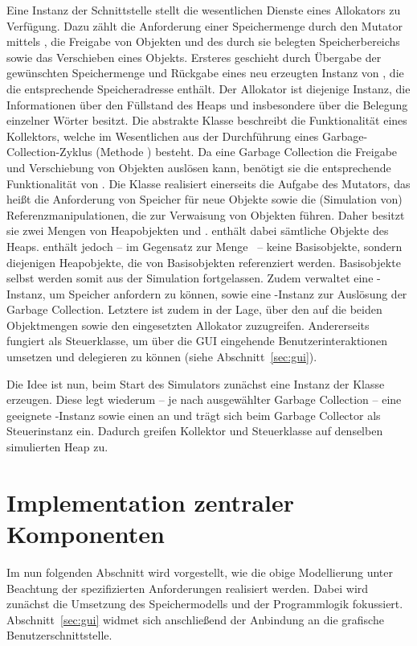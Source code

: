 Eine Instanz der Schnittstelle  stellt die wesentlichen Dienste eines Allokators zu Verfügung.
Dazu zählt die Anforderung einer Speichermenge durch den Mutator mittels , die Freigabe von Objekten und des durch sie belegten Speicherbereichs sowie das Verschieben eines Objekts.
Ersteres geschieht durch Übergabe der gewünschten Speichermenge und Rückgabe eines neu erzeugten Instanz von , die die entsprechende Speicheradresse enthält.
Der Allokator ist diejenige Instanz, die Informationen über den Füllstand des Heaps und insbesondere über die Belegung einzelner Wörter besitzt.
Die abstrakte Klasse  beschreibt die Funktionalität eines Kollektors, welche im Wesentlichen aus der Durchführung eines Garbage-Collection-Zyklus (Methode ) besteht.
Da eine Garbage Collection die Freigabe und Verschiebung von Objekten auslösen kann, benötigt sie die entsprechende Funktionalität von .
Die Klasse  realisiert einerseits die Aufgabe des Mutators, das heißt die Anforderung von Speicher für neue Objekte sowie die (Simulation von) Referenzmanipulationen, die zur Verwaisung von Objekten führen.
Daher besitzt sie zwei Mengen von Heapobjekten  und .
 enthält dabei sämtliche Objekte des Heaps.
 enthält jedoch -- im Gegensatz zur Menge \Roots\ -- keine Basisobjekte, sondern diejenigen Heapobjekte, die von Basisobjekten referenziert werden.
Basisobjekte selbst werden somit aus der Simulation fortgelassen.
Zudem verwaltet  eine -Instanz, um Speicher anfordern zu können, sowie eine -Instanz zur Auslösung der Garbage Collection.
Letztere ist zudem in der Lage, über den  auf die beiden Objektmengen sowie den eingesetzten Allokator zuzugreifen.
Andererseits fungiert  als Steuerklasse, um über die GUI eingehende Benutzerinteraktionen umsetzen und delegieren zu können (siehe Abschnitt~\ref{sec:gui}).

Die Idee ist nun, beim Start des Simulators zunächst eine Instanz der Klasse  erzeugen.
Diese legt wiederum -- je nach ausgewählter Garbage Collection -- eine geeignete -Instanz sowie einen  an und trägt sich beim Garbage Collector als Steuerinstanz ein.
Dadurch greifen Kollektor und Steuerklasse auf denselben simulierten Heap zu.

\section{Implementation zentraler Komponenten}
\label{sec:implementation}
Im nun folgenden Abschnitt wird vorgestellt, wie die obige Modellierung unter Beachtung der spezifizierten Anforderungen realisiert werden.
Dabei wird zunächst die Umsetzung des Speichermodells und der Programmlogik fokussiert.
Abschnitt~\ref{sec:gui} widmet sich anschließend der Anbindung an die grafische Benutzerschnittstelle.

